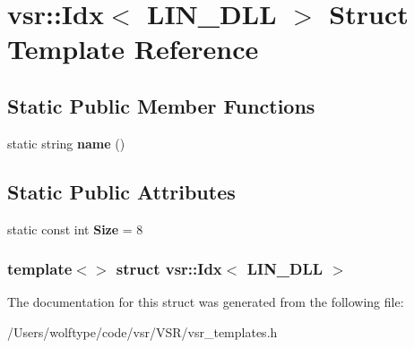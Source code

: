 \hypertarget{structvsr_1_1_idx_3_01_l_i_n___d_l_l_01_4}{\section{vsr\-:\-:Idx$<$ L\-I\-N\-\_\-\-D\-L\-L $>$ Struct Template Reference}
\label{structvsr_1_1_idx_3_01_l_i_n___d_l_l_01_4}
}
\subsection*{Static Public Member Functions}
\begin{DoxyCompactItemize}
\item 
\hypertarget{structvsr_1_1_idx_3_01_l_i_n___d_l_l_01_4_a40a139b31fadf16025e8448a7bae5d9f}{static string {\bfseries name} ()}\label{structvsr_1_1_idx_3_01_l_i_n___d_l_l_01_4_a40a139b31fadf16025e8448a7bae5d9f}

\end{DoxyCompactItemize}
\subsection*{Static Public Attributes}
\begin{DoxyCompactItemize}
\item 
\hypertarget{structvsr_1_1_idx_3_01_l_i_n___d_l_l_01_4_a88d2929489c3523d5006d1c8a8b9c538}{static const int {\bfseries Size} = 8}\label{structvsr_1_1_idx_3_01_l_i_n___d_l_l_01_4_a88d2929489c3523d5006d1c8a8b9c538}

\end{DoxyCompactItemize}
\subsubsection*{template$<$$>$ struct vsr\-::\-Idx$<$ L\-I\-N\-\_\-\-D\-L\-L $>$}



The documentation for this struct was generated from the following file\-:\begin{DoxyCompactItemize}
\item 
/\-Users/wolftype/code/vsr/\-V\-S\-R/vsr\-\_\-templates.\-h\end{DoxyCompactItemize}
